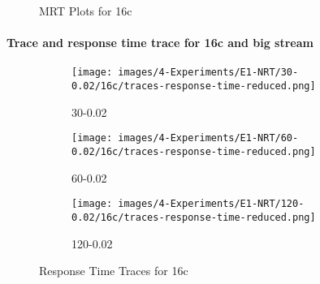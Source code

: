 \begin{figure}[H]
    \centering
    
    \vspace{0.5cm} %


    \caption{MRT Plots for 16c}
    \label{img:exps-small-mrt-16c}
\end{figure}

\paragraph{Trace and response time trace for 16c and big stream\\}
\newpage

\begin{figure}[H]
    \centering
    \begin{subfigure}[b]{\textwidth}
        \centering
        \texttt{[image: images/4-Experiments/E1-NRT/30-0.02/16c/traces-response-time-reduced.png]}
        \caption{30-0.02}
    \end{subfigure}
    
    \vspace{0.5cm} %
    \begin{subfigure}[b]{\textwidth}
        \centering
        \texttt{[image: images/4-Experiments/E1-NRT/60-0.02/16c/traces-response-time-reduced.png]}
        \caption{60-0.02}
    \end{subfigure}
    
    \vspace{0.5cm} %
    \begin{subfigure}[b]{\textwidth}
        \centering
        \texttt{[image: images/4-Experiments/E1-NRT/120-0.02/16c/traces-response-time-reduced.png]}
        \caption{120-0.02}
    \end{subfigure}

    \caption{Response Time Traces for 16c}
    \label{img:exps-small-responsetimetraces-16c}
\end{figure}

